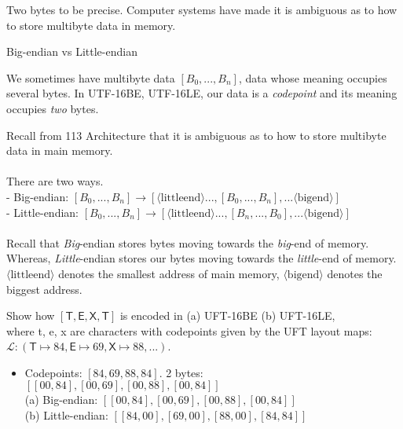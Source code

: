 Two bytes to be precise. Computer systems have 
made it is ambiguous as to how to store multibyte data in memory. 

\begin{sidenote}{Big-endian vs Little-endian}

We sometimes have multibyte data $[B_0, ..., B_n]$, 
data whose meaning occupies several bytes. In UTF-16BE, UTF-16LE, 
our data is a \textit{codepoint} and its meaning occupies \textit{two} bytes. 

Recall from 113 Architecture that it is ambiguous as to how to 
store multibyte data in main memory. 
~\\~\\
There are two ways.\\
- Big-endian: $[B_0, ..., B_n] \rightarrow [\langle \text{littleend} \rangle ..., [B_0, ..., B_n], ...\langle \text{bigend} \rangle]$\\
- Little-endian: $[B_0, ..., B_n] \rightarrow [\langle \text{littleend} \rangle ..., [B_n, ..., B_0], ...\langle \text{bigend} \rangle]$
~\\~\\
Recall that \textit{Big}-endian stores bytes moving towards the 
\textit{big}-end of memory. 
Whereas, \textit{Little}-endian stores our bytes
moving towards the \textit{little}-end of memory.
$\langle \text{littleend} \rangle$ denotes the smallest address of main memory, 
$\langle \text{bigend} \rangle$ denotes the biggest address. 
\end{sidenote}

\frmrule 

\begin{example}
Show how $[\textsf{T},\textsf{E},\textsf{X},\textsf{T}]$ is encoded in (a) UFT-16BE (b) UFT-16LE,\\
where \textsf{t}, \textsf{e}, \textsf{x} are characters with codepoints given by
the UFT layout maps:\\ $\mathcal{L}: (\textsf{T} \mapsto 84,  \textsf{E} \mapsto 69, \textsf{X} \mapsto 88, ...)$.

\begin{itemize}
\item Codepoints: $[84,69,88,84]$. 2 bytes: $[[00, 84], [00, 69],[00, 88], [00, 84]]$\\
(a) Big-endian: $[[00, 84], [00, 69],[00, 88], [00, 84]]$\\
(b) Little-endian: $[[84, 00], [69, 00],[88, 00], [84, 84]]$
\end{itemize}
\end{example}

